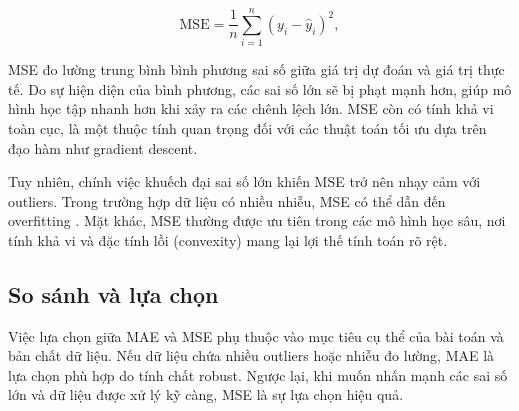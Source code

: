 \begin{equation}
\text{MSE} = \frac{1}{n} \sum_{i=1}^{n} (y_i - \hat{y}_i)^2,
\label{mse}
\end{equation}

MSE đo lường trung bình bình phương sai số giữa giá trị dự đoán và giá trị thực tế. Do sự hiện diện của bình phương, các sai số lớn sẽ bị phạt mạnh hơn, giúp mô hình học tập nhanh hơn khi xảy ra các chênh lệch lớn. MSE còn có tính khả vi toàn cục, là một thuộc tính quan trọng đối với các thuật toán tối ưu dựa trên đạo hàm như gradient descent.

Tuy nhiên, chính việc khuếch đại sai số lớn khiến MSE trở nên nhạy cảm với outliers. Trong trường hợp dữ liệu có nhiều nhiễu, MSE có thể dẫn đến overfitting \cite{chung2020comprehensive}. Mặt khác, MSE thường được ưu tiên trong các mô hình học sâu, nơi tính khả vi và đặc tính lồi (convexity) mang lại lợi thế tính toán rõ rệt.

\subsection{So sánh và lựa chọn}

Việc lựa chọn giữa MAE và MSE phụ thuộc vào mục tiêu cụ thể của bài toán và bản chất dữ liệu. Nếu dữ liệu chứa nhiều outliers hoặc nhiễu đo lường, MAE là lựa chọn phù hợp do tính chất robust. Ngược lại, khi muốn nhấn mạnh các sai số lớn và dữ liệu được xử lý kỹ càng, MSE là sự lựa chọn hiệu quả.
